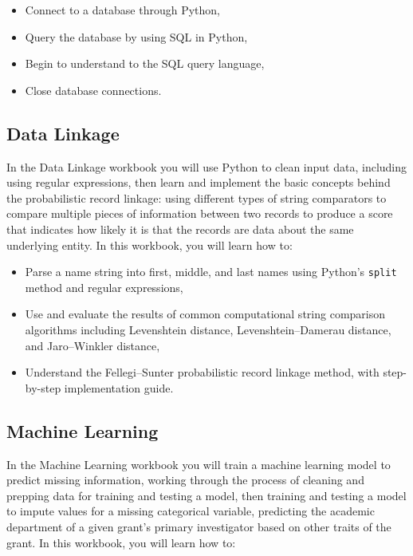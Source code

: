 \documentclass[]{krantz}
\begin{document}
\begin{itemize}
\item
  Connect to a database through Python,
\item
  Query the database by using SQL in Python,
\item
  Begin to understand to the SQL query language,
\item
  Close database connections.
\end{itemize}

\subsection{Data Linkage}\label{data-linkage}

In the Data Linkage workbook you will use Python to clean input data,
including using regular expressions, then learn and implement the basic
concepts behind the probabilistic record linkage: using different types
of string comparators to compare multiple pieces of information between
two records to produce a score that indicates how likely it is that the
records are data about the same underlying entity. In this workbook, you
will learn how to:

\begin{itemize}
\item
  Parse a name string into first, middle, and last names using Python's
  \texttt{split} method and regular expressions,
\item
  Use and evaluate the results of common computational string comparison
  algorithms including Levenshtein distance, Levenshtein--Damerau
  distance, and Jaro--Winkler distance,
\item
  Understand the Fellegi--Sunter probabilistic record linkage method,
  with step-by-step implementation guide.
\end{itemize}

\subsection{Machine Learning}\label{machine-learning}

In the Machine Learning workbook you will train a machine learning model
to predict missing information, working through the process of cleaning
and prepping data for training and testing a model, then training and
testing a model to impute values for a missing categorical variable,
predicting the academic department of a given grant's primary
investigator based on other traits of the grant. In this workbook, you
will learn how to:
\end{document}
